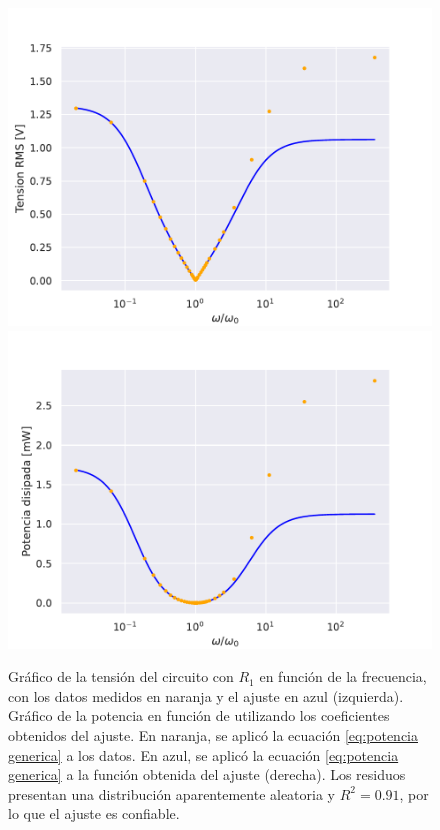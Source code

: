 \begin{figure} [H]
    \centering
    \includegraphics[scale=0.5]{figuras/RLC-PARALELO-1/tension.pdf}
    \includegraphics[scale=0.45]{figuras/RLC-PARALELO-1/potencia.pdf}
    \caption{Gráfico de la tensión del circuito con $R_1$ en función de la frecuencia, con los datos medidos en naranja y el ajuste en azul (izquierda). Gráfico de la potencia  en función de utilizando los coeficientes obtenidos del ajuste. En naranja, se aplicó la ecuación \eqref{eq:potencia generica} a los datos. En azul, se aplicó la ecuación \eqref{eq:potencia generica} a la función obtenida del ajuste (derecha). Los residuos  presentan una distribución aparentemente aleatoria y $R^2=0.91$, por lo que el ajuste es confiable.}
    \label{fig:paralelo potencia1}
\end{figure}
